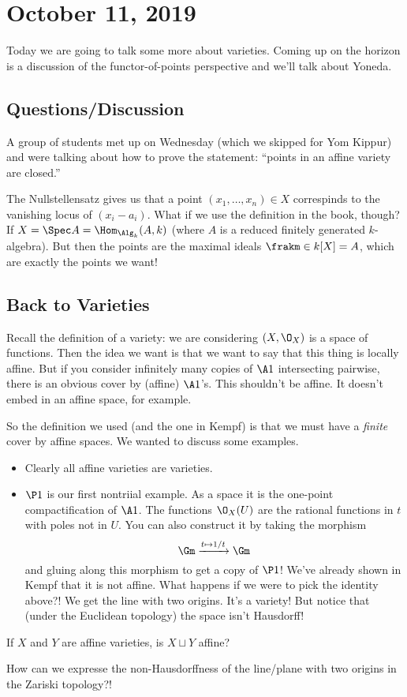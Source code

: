 \documentclass[12pt]{article}
\begin{document}
\section{October 11, 2019}
Today we are going to talk some more about varieties. Coming up on the horizon is a discussion of 
the functor-of-points perspective and we'll talk about Yoneda.

\subsection{Questions/Discussion}
A group of students met up on Wednesday (which we skipped for Yom Kippur) and were talking about 
how to prove the statement: ``points in an affine variety are closed.''

The Nullstellensatz gives us that a point $(x_1,\dots,x_n)\in X$ correspinds to the vanishing locus of $(x_i-a_i)$. 
What if we use the definition in the book, though? If $X=\Spec A=\Hom_{\Alg_k}(A,k)$ (where $A$ is a reduced finitely generated 
$k$-algebra). But then the points are the maximal ideals $\frakm\in k[X]=A$, which are exactly the points we want!

\subsection{Back to Varieties}
Recall the definition of a variety: we are considering $(X,\O_X)$ is a space of functions. Then the idea we want is that we want to say 
that this thing is locally affine. But if you consider infinitely many copies of $\A1$ intersecting pairwise, there is 
an obvious cover by (affine) $\A1$'s. This shouldn't be affine. It doesn't embed in an affine space, for example.

So the definition we used (and the one in Kempf) is that we must have a \textit{finite} cover by affine spaces. We wanted to discuss some examples.
\begin{itemize}
	\item Clearly all affine varieties are varieties.
	\item $\P1$ is our first nontriial example. As a space it is the one-point compactification of $\A1$. The functions 
	$\O_X(U)$ are the rational functions in $t$ with poles not in $U$. You can also construct it by taking the morphism 
	\[\Gm\xrightarrow{t\mapsto 1/t}\Gm\]
	and gluing along this morphism to get a copy of $\P1$! We've already shown in Kempf that it is not affine. 
	What happens if we were to pick the identity above?! We get the line with two origins. It's a variety! But notice that 
	(under the Euclidean topology) the space isn't Hausdorff! 
\end{itemize}
\begin{prob}
	If $X$ and $Y$ are affine varieties, is $X\sqcup Y$ affine?
\end{prob}
\begin{prob}
	How can we expresse the non-Hausdorffness of the line/plane with two origins in the Zariski topology?!
\end{prob}
\end{document}
